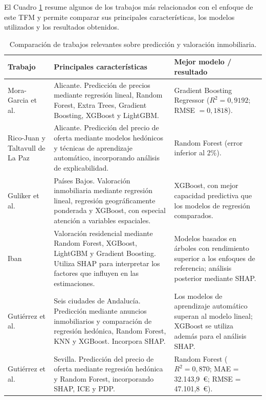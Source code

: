 \documentclass[IB]{TFUOC}%
\begin{document}
El Cuadro \ref{tab:literatura_inmobiliaria} resume algunos de los trabajos más relacionados con el enfoque de este TFM y permite comparar sus principales características, los modelos utilizados y los resultados obtenidos.

\begin{table}[!htbp]
\centering
\caption{Comparación de trabajos relevantes sobre predicción y valoración inmobiliaria.}
\label{tab:literatura_inmobiliaria}
\small
\renewcommand{\arraystretch}{1.35}

\begin{tabularx}{\textwidth}{
>{\raggedright\arraybackslash}p{3.2cm}
>{\raggedright\arraybackslash}X
>{\raggedright\arraybackslash}p{3.2cm}
}

\toprule
\textbf{Trabajo} &
\textbf{Principales características} &
\textbf{Mejor modelo / resultado}
\tabularnewline

\midrule

Mora-Garcia et al. \cite{moragarcia2022housing} &
Alicante. Predicción de precios mediante regresión lineal, Random Forest, Extra Trees, Gradient Boosting, XGBoost y LightGBM. &
Gradient Boosting Regressor ($R^2=0,9192$; RMSE $=0,1818$).
\tabularnewline

\midrule

Rico-Juan y Taltavull de La Paz \cite{ricojuan2021asking} &
Alicante. Predicción del precio de oferta mediante modelos hedónicos y técnicas de aprendizaje automático, incorporando análisis de explicabilidad. &
Random Forest (error inferior al 2\%).
\tabularnewline

\midrule

Guliker et al. \cite{guliker2022spatial} &
Países Bajos. Valoración inmobiliaria mediante regresión lineal, regresión geográficamente ponderada y XGBoost, con especial atención a variables espaciales. &
XGBoost, con mejor capacidad predictiva que los modelos de regresión comparados.
\tabularnewline

\midrule

Iban \cite{iban2022explainable} &
Valoración residencial mediante Random Forest, XGBoost, LightGBM y Gradient Boosting. Utiliza SHAP para interpretar los factores que influyen en las estimaciones. &
Modelos basados en árboles con rendimiento superior a los enfoques de referencia; análisis posterior mediante SHAP.
\tabularnewline

\midrule

Gutiérrez et al. \cite{gutierrez2026andalusia} &
Seis ciudades de Andalucía. Predicción mediante anuncios inmobiliarios y comparación de regresión hedónica, Random Forest, KNN y XGBoost. Incorpora SHAP. &
Los modelos de aprendizaje automático superan al modelo lineal; XGBoost se utiliza además para el análisis SHAP.
\tabularnewline

\midrule

Gutiérrez et al. \cite{gutierrez2026sevilla} &
Sevilla. Predicción del precio de oferta mediante regresión hedónica y Random Forest, incorporando SHAP, ICE y PDP. &
Random Forest ($R^2=0,870$; MAE = 32.143,9~€; RMSE = 47.101,8~€).
\tabularnewline

\bottomrule
\end{tabularx}
\end{table}
\end{document}
